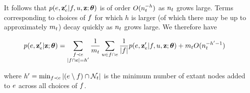 \documentclass[aps,pre,reprint,superscriptaddress,nofootinbib]{revtex4-2}
\begin{document}
        It follows that $p(e,\mathbf{z}_e' | f, u, \mathbf{z}; \boldsymbol{\theta})$ is of order $O(n_{t}^{-h})$ as $n_{t}$ grows large.
        Terms corresponding to choices of $f$ for which $h$ is larger (of which there may be up to approximately $m_{t}$) decay quickly as $n_{t}$ grows large. 
        We therefore have 
        \begin{widetext}
            \begin{align}
                p(e,\mathbf{z}_e'|\mathbf{z};\boldsymbol{\theta}) &= \sum_{\substack{f \prec e \\ |f \cap e| = h'}} \frac{1}{m_{t}}\sum_{u \in f \cap e} \frac{1}{|f|}  p(e,\mathbf{z}_e' | f, u, \mathbf{z}; \boldsymbol{\theta})  + m_{t}O(n_{t}^{-h'-1}) \label{eq:sa-approx}
            \end{align}
        \end{widetext}
        where $h' = \min_{f \prec e} |(e \setminus f) \cap \mathcal{N}_{t}|$ is the minimum number of extant nodes added to $e$ across all choices of $f$.
\end{document}
